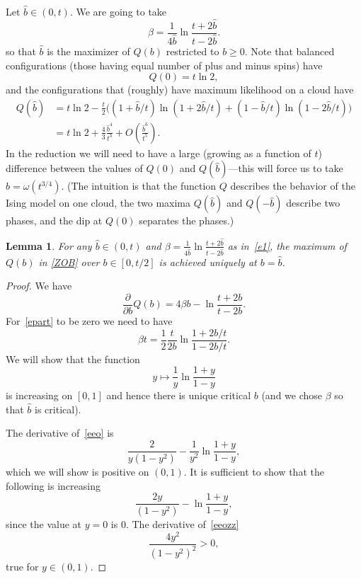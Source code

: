 \documentclass[11pt]{article}
\newtheorem{lemma}[theorem]{Lemma}
\begin{document}
Let $\hat{b}\in (0,t)$. We are going to take
\begin{equation}\label{e1}
\beta = \frac{1}{4\hat{b}}\ln \frac{t + 2\hat{b}}{t - 2\hat{b}}.
\end{equation}
so that $\hat{b}$ is the maximizer of $Q(b)$ restricted to $b\geq 0$. Note that balanced configurations (those having equal number of plus and minus spins) have
\begin{equation}\label{Q0}
Q(0) = t\ln 2,
\end{equation}
and the configurations that (roughly) have maximum likelihood on a cloud have
\begin{equation}
\begin{split}
Q(\hat{b}) & = t\ln 2 - \frac{t}{2}\Big( (1+\hat{b}/t)\ln(1+2\hat{b}/t) + (1-\hat{b}/t)\ln(1-2\hat{b}/t) \Big) \\ \label{QB}
& = t\ln 2 + \frac{4}{3} \frac{\hat{b}^4}{t^3} + O\left(\frac{\hat{b}^6}{t^5}\right).
\end{split}
\end{equation}
In the reduction we will need to have a large (growing as a function of $t$) difference between the values of $Q(0)$ and $Q(\hat{b})$---this will
force us to take $\hat{b}=\omega(t^{3/4})$. (The intuition is that the function $Q$ describes the behavior of the Ising model on one cloud, the two maxima 
$Q(\hat{b})$ and $Q(-\hat{b})$ describe two phases, and the dip at $Q(0)$ separates the phases.)

\begin{lemma}\label{lem:maxb}
For any $\hat{b}\in (0,t)$ and $\beta=\frac{1}{4\hat{b}}\ln \frac{t + 2\hat{b}}{t - 2\hat{b}}$ as in~\eqref{e1}, the maximum of $Q(b)$ in \eqref{ZOB} over $b\in [0,t/2]$  is achieved uniquely at $b=\hat{b}$.
\end{lemma}
\begin{proof}
We have
\begin{equation}\label{epart}
\frac{\partial}{\partial b} Q(b) = 4\beta b - \ln\frac{t+2b}{t-2b}.
\end{equation}
For~\eqref{epart} to be zero we need to have
$$\beta t = \frac{1}{2} \frac{t}{2b} \ln\frac{1+2b/t}{1-2b/t}.$$
We will show that the function
\begin{equation}\label{eeo}
y\mapsto \frac{1}{y}\ln\frac{1+y}{1-y}
\end{equation}
is increasing on $[0,1]$ and hence there is unique critical $b$ (and we chose $\beta$ so that $\hat{b}$ is critical).

The derivative of~\eqref{eeo} is
$$
\frac{2}{y(1-y^2)} - \frac{1}{y^2}\ln\frac{1+y}{1-y},
$$
which we will show is positive on $(0,1)$. It is sufficient to show that the following is increasing
\begin{equation}\label{eeozz}
\frac{2y}{(1-y^2)} - \ln\frac{1+y}{1-y},
\end{equation}
since the value at $y=0$ is $0$. The derivative of~\eqref{eeozz} 
$$
\frac{4y^2}{(1-y^2)^2}>0,
$$
true for $y\in (0,1)$.
\end{proof}
\end{document}
